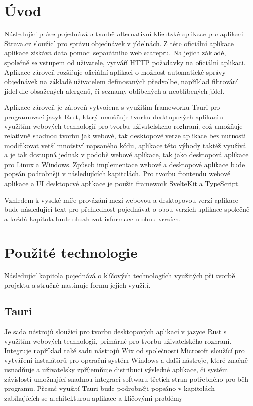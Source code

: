 \documentclass[12pt]{article}
\begin{document}
\section*{Úvod}
Následující práce pojednává o tvorbě alternativní klientské aplikace pro aplikaci Strava.cz sloužící pro správu objednávek v jídelnách. Z této oficiální aplikace aplikace získává data pomocí separátního web scarepru. Na jejich základě, společně se vstupem od uživatele, vytváří HTTP požadavky na oficiální aplikaci. Aplikace zároveň rozšiřuje oficiální aplikaci o možnost automatické správy objednávek na základě uživatelem definovaných předvolbe, například filtrování jídel dle obsažených alergenů, či seznamy oblíbených a neoblíbených jídel.

Aplikace zároveň je zároveň vytvořena s využitím frameworku Tauri pro programovací jazyk Rust, který umožňuje tvorbu desktopových aplikací s využitím webových technologií pro tvorbu uživatelského rozhraní, což umožňuje relativně snadnou tvorbu jak webové, tak desktopové verze aplikace bez nutnosti modifikovat vetší množství napsaného kódu, aplikace této výhody taktéž využívá a je tak dostupná jednak v podobě webové aplikace, tak jako desktopová aplikace pro Linux a Windows. Způsob implementace webové a desktopové aplikace bude popsán podrobněji v následujících kapitolách. Pro tvorbu frontendu webové aplikace a UI desktopové aplikace je použit framework SvelteKit a TypeScript.

Vzhledem k vysoké míře provázání mezi webovou a desktopovou verzí aplikace bude následující text pro přehlednost pojednávat o obou verzích aplikace společně a každá kapitola bude obsahovat informace o obou verzích.
\newpage
\section{Použité technologie}
Následující kapitola pojednává o klíčových technologiích využitých při tvorbě projektu a stručně nastinuje formu jejich využití.
\subsection{Tauri}
Je sada nástrojů sloužící pro tvorbu desktopových aplikací v jazyce Rust s využitím webových technologii, primárně pro tvorbu uživatelského rozhraní. Integruje například také sadu nástrojů Wix od společnosti Microsoft sloužící pro vytváření instalátorů pro operační systém Windows\cite{wix} a další nástroje\cite{building}, které značně usnadňuje a uživatelsky zpříjemňuje distribuci výsledné aplikace, či systém závislostí umožnující snadnou integraci softwaru třetích stran potřebného pro běh programu. Přesné využití Tauri bude podrobněji popsáno v kapitolách zabíhajících se architekturou aplikace a klíčovými problémy 
\end{document}

